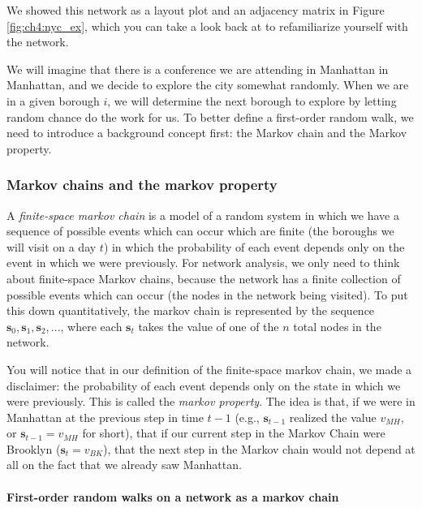We showed this network as a layout plot and an adjacency matrix in Figure \ref{fig:ch4:nyc_ex}, which you can take a look back at to refamiliarize yourself with the network.

We will imagine that there is a conference we are attending in Manhattan in Manhattan, and we decide to explore the city somewhat randomly. When we are in a given borough $i$, we will determine the next borough to explore by letting random chance do the work for us. To better define a first-order random walk, we need to introduce a background concept first: the Markov chain and the Markov property. 

\subsubsection*{Markov chains and the markov property}

A \textit{finite-space markov chain} is a model of a random system in which we have a sequence of possible events which can occur which are finite (the boroughs we will visit on a day $t$) in which the probability of each event depends only on the event in which we were previously. For network analysis, we only need to think about finite-space Markov chains, because the network has a finite collection of possible events which can occur (the nodes in the network being visited). To put this down quantitatively, the markov chain is represented by the sequence $\mathbf s_0, \mathbf s_1, \mathbf s_2, ...$, where each $\mathbf s_t$ takes the value of one of the $n$ total nodes in the network. 

You will notice that in our definition of the finite-space markov chain, we made a disclaimer: the probability of each event depends only on the state in which we were previously. This is called the \textit{markov property}. The idea is that, if we were in Manhattan at the previous step in time $t - 1$ (e.g., $\mathbf s_{t-1}$ realized the value $v_{MH}$, or $\mathbf s_{t-1} = v_{MH}$ for short), that if our current step in the Markov Chain were Brooklyn ($\mathbf s_t = v_{BK}$), that the next step in the Markov chain would not depend at all on the fact that we already saw Manhattan. 

\paragraph*{First-order random walks on a network as a markov chain}


